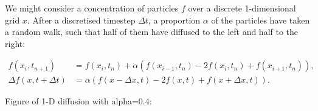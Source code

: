       We might consider a concentration of particles $f$ over a discrete 1-dimensional grid $x$. After a discretised timestep $\Delta t$, a proportion $\alpha$ of the particles have taken a random walk, such that half of them have diffused to the left and half to the right:
      
      \begin{align}
        f(x_i, t_{n+1}) &= f(x_i, t_n) + \alpha (f(x_{i-1}, t_n) - 2f(x_i, t_n) + f(x_{i+1}, t_n)), \\
        \Delta f(x, t + \Delta t) &= \alpha (f(x - \Delta x, t) - 2f(x, t) + f(x + \Delta x, t)). \end{align}
      
      Figure of 1-D diffusion with alpha=0.4:
      \begin{figure}[htbp]
        \centering

\end{figure}
